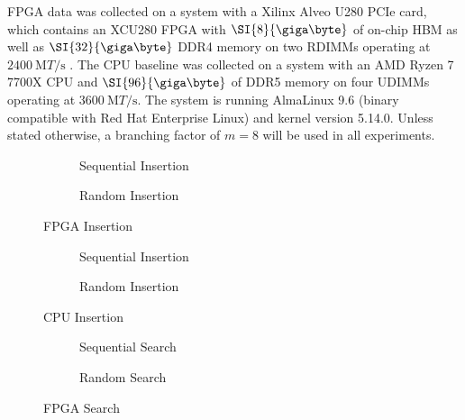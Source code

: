 

FPGA data was collected on a system with a Xilinx Alveo U280 PCIe card,
which contains an XCU280 FPGA with $\SI{8}{\giga\byte}$ of on-chip HBM as well
as $\SI{32}{\giga\byte}$ DDR4 memory on two RDIMMs operating at
$\SI{2400}{\mega{T}\per\second}$ \autocite{u280}. The CPU baseline was collected
on a system with an AMD Ryzen 7 7700X CPU and $\SI{96}{\giga\byte}$ of DDR5
memory on four UDIMMs operating at $\SI{3600}{\mega{T}\per\second}$. The system
is running AlmaLinux 9.6 (binary compatible with Red Hat Enterprise Linux) and
kernel version 5.14.0.
%
Unless stated otherwise, a branching factor of $m=8$ will be used in all
experiments.



\begin{figure}[H]
	\centering
	\begin{subfigure}{7.5cm}
		\centering
		
		\caption{Sequential Insertion}
		\label{fig:fpga-insert-sequential}
	\end{subfigure}
	\begin{subfigure}{7.5cm}
		\centering
		
		\caption{Random Insertion}
		\label{fig:fpga-insert-random}
	\end{subfigure}
	\caption{FPGA Insertion}
	\label{fig:fpga-insert}
\end{figure}

\begin{figure}[H]
	\centering
	\begin{subfigure}{7.5cm}
		\centering
		
		\caption{Sequential Insertion}
		\label{fig:cpu-insert-sequential}
	\end{subfigure}
	\begin{subfigure}{7.5cm}
		\centering
		
		\caption{Random Insertion}
		\label{fig:cpu-insert-random}
	\end{subfigure}
	\caption{CPU Insertion}
	\label{fig:cpu-insert}
\end{figure}


\begin{figure}[H]
	\centering
	\begin{subfigure}{7.5cm}
		\centering
		
		\caption{Sequential Search}
		\label{fig:fpga-search-sequential}
	\end{subfigure}
	\begin{subfigure}{7.5cm}
		\centering
		
		\caption{Random Search}
		\label{fig:fpga-search-random}
	\end{subfigure}
	\caption{FPGA Search}
	\label{fig:fpga-search}
\end{figure}

